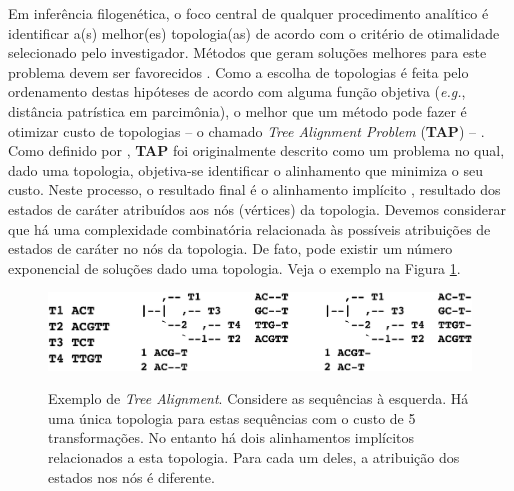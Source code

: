 \begin{refsection}
Em inferência filogenética, o foco central de qualquer procedimento analítico é identificar a(s) melhor(es) topologia(as) de acordo com o critério de otimalidade selecionado pelo investigador. Métodos que geram soluções melhores para este problema devem ser favorecidos \parencite[][]{Wheeler_and_Giribet_2009}. Como a escolha de topologias é feita pelo ordenamento destas hipóteses de acordo com alguma função objetiva (\textit{e.g.}, distância patrística em parcimônia), o melhor que um método pode fazer é otimizar custo de topologias -- o chamado \textit{Tree Alignment Problem} (\textbf{TAP}) -- \parencite[][]{Sankoff_1975}. Como definido por \textcite[][:133]{Wheeler_2012}, \textbf{TAP} foi originalmente descrito como um problema no qual, dado uma topologia, objetiva-se identificar o alinhamento que minimiza o seu custo. Neste processo, o resultado final é o alinhamento implícito \parencite[senso ][]{Wheeler_2003a}, resultado dos estados de caráter atribuídos aos nós (vértices) da topologia. Devemos considerar que há uma complexidade combinatória relacionada às possíveis atribuições de estados de caráter no nós da topologia. De fato, pode existir um número exponencial de soluções dado uma topologia. Veja o exemplo na Figura \ref{tut9:fig:tap}. 

 
  \begin{figure}[H]
      {\includegraphics[scale=0.9]{figures/tut9/tap.eps}}
	{\caption[Exemplo de \textit{Tree Alignment}]{Exemplo de \textit{Tree Alignment}. Considere as sequências à esquerda. Há uma única topologia para estas sequências com o custo de 5 transformações. No entanto há dois alinhamentos implícitos relacionados a esta topologia. Para cada um deles, a atribuição dos estados nos nós é diferente.}\label{tut9:fig:tap}}
  \end{figure}



\end{refsection}
